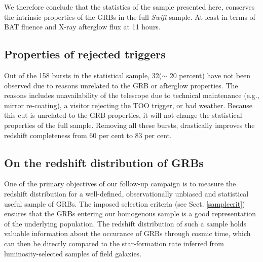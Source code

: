 \documentclass{aa}    %
\begin{document}
We therefore conclude that the statistics of the sample presented here,
conserves the intrinsic properties of the GRBs in the full \textit{Swift}
sample. At least in terms of BAT fluence and X-ray afterglow flux at 11 hours.

\subsection{Properties of rejected triggers} \label{badbursts}

Out of the 158 bursts in the statistical sample, 32($\sim$ 20 percent) have not
been observed due to reasons unrelated to the GRB or afterglow properties. The
reasons includes unavailability of the telescope due to technical maintenance
(e.g., mirror re-coating), a visitor rejecting the TOO trigger, or bad weather.
Because this cut is unrelated to the GRB properties, it will not change the
statistical properties of the full sample. Removing all these bursts,
drastically improves the redshift completeness from 60 per cent to 83 per cent.

\subsection{On the redshift distribution of GRBs} \label{redshift}

One of the primary objectives of our follow-up campaign is to measure the
redshift distribution for a well-defined, observationally unbiased and
statistical useful sample of GRBs. The imposed selection criteria (see Sect.
\ref{samplecrit}) ensures that the GRBs entering our homogenous sample is a good
representation of the underlying population. The redshift distribution of such
a sample holds valuable information about the occurance of GRBs through cosmic
time, which can then be directly compared to the star-formation rate inferred
from luminosity-selected samples of field galaxies.
\end{document}

